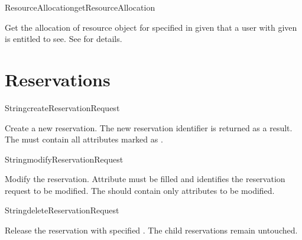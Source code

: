 \begin{Api}
\begin{ApiCmd}{ResourceAllocation}{getResourceAllocation}%
%
%
%
\end{ApiCmd}
Get the allocation of resource object for specified  in given  that a user with given  is entitled to see. See  for details.

\end{Api}


\section{Reservations}

\begin{Api}

\begin{ApiCmd}{String}{createReservationRequest}%
%
%
\end{ApiCmd}
Create a new reservation. The new reservation identifier is returned as a result. The  must contain all attributes marked as \ApiRequired.

\begin{ApiCmd}{String}{modifyReservationRequest}%
%
%
\end{ApiCmd}
Modify the reservation. Attribute  must be filled and identifies the reservation request to be modified. The  should contain only attributes to be modified.

\begin{ApiCmd}{String}{deleteReservationRequest}%
%
%
\end{ApiCmd}
Release the reservation with specified . The child reservations remain untouched.


\end{Api}
